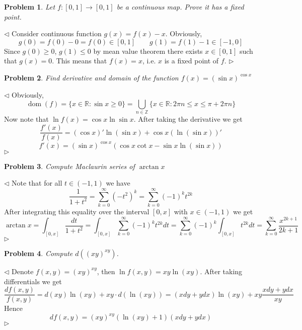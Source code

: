 \documentclass[12pt]{article}
\newtheorem{problem}{Problem}[subsection]
\newenvironment{solution}{\par $\triangleleft$}{$\triangleright$}
\begin{document}
\begin{problem} Let $f\colon [0,1 ]\to[0,1]$ be a continuous map. Prove it has a
fixed point.
\end{problem}
\begin{solution} Consider continuous function $g(x)=f(x)-x$. Obviously,
    $$
        g(0)=f(0)-0=f(0)\in[0,1]\qquad g(1)=f(1)-1\in[-1,0]
    $$
    Since $g(0)\geq 0$, $g(1)\leq 0$ by mean value theorem there exists
    $x\in[0,1]$ such that $g(x)=0$. This means that $f(x)=x$, i.e. $x$ is a
    fixed point of $f$.
\end{solution}


\begin{problem} Find derivative and domain of the function $f(x)={(\sin
    x)}^{\cos x}$
\end{problem}
\begin{solution} Obviously,
    $$
        \operatorname{dom}(f)=\{x\in\mathbb{R}:\sin x\geq 0\}
        =\bigcup_{n\in\mathbb{Z}}\{x\in\mathbb{R}:2\pi n\leq x\leq \pi+2\pi n\}
    $$
    Now note that $\ln f(x)=\cos x\ln\sin x$. After taking the derivative we get
    $$
        \frac{f'(x)}{f(x)}=(\cos x)'\ln(\sin x)+\cos x(\ln(\sin x))'
    $$
    $$
        f'(x)={(\sin x)}^{\cos x}(\cos x\cot x-\sin x\ln(\sin x))
    $$
\end{solution}

\begin{problem} Compute Maclaurin series of $\arctan x$
\end{problem}
\begin{solution} Note that for all $t\in(-1,1)$ we have
    $$
        \frac{1}{1+t^2}
        =\sum_{k=0}^\infty{(-t^2)}^k
        =\sum_{k=0}^\infty{(-1)}^k t^{2k}
    $$
    After integrating this equality over the interval $[0,x]$ with $x\in(-1,1)$
    we get
    $$
        \arctan x=\int_{[0,x]}\frac{dt}{1+t^2}
        =\int_{[0,x]}\sum_{k=0}^\infty{(-1)}^k t^{2k}dt
        =\sum_{k=0}^\infty{(-1)}^k\int_{[0,x]}t^{2k}dt
        =\sum_{k=0}^\infty\frac{x^{2k+1}}{2k+1}
    $$
\end{solution}


\begin{problem} Compute $d({(xy)}^{xy})$.
\end{problem}
\begin{solution} Denote $f(x,y)={(xy)}^{xy}$, then $\ln f(x,y)=xy\ln(xy)$. After
    taking differentials we get
    $$
        \frac{d f(x,y)}{f(x,y)}
        =d(xy)\ln (xy)+xy\cdot d(\ln(xy))=(xdy+ydx)\ln(xy)+xy\frac{xdy+ydx}{xy}
    $$
    Hence
    $$
        df(x,y)={(xy)}^{xy}(\ln(xy)+1)(xdy+ydx)
    $$
\end{solution}
\end{document}
